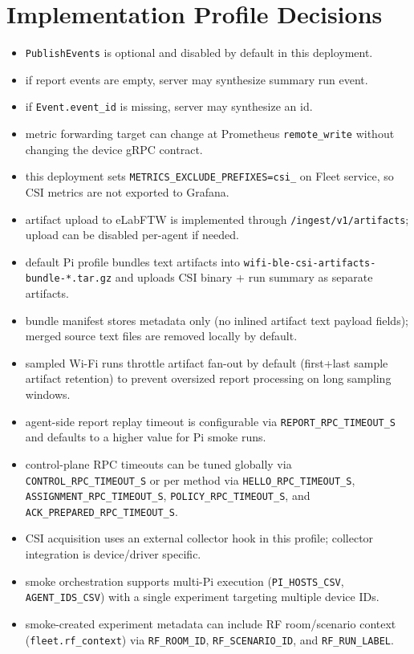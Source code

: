 \documentclass[11pt,a4paper]{article}
\begin{document}
\section{Implementation Profile Decisions}
\begin{itemize}
  \item \texttt{PublishEvents} is optional and disabled by default in this deployment.
  \item if report events are empty, server may synthesize summary run event.
  \item if \texttt{Event.event\_id} is missing, server may synthesize an id.
  \item metric forwarding target can change at Prometheus \texttt{remote\_write} without changing the device gRPC contract.
  \item this deployment sets \texttt{METRICS\_EXCLUDE\_PREFIXES=csi\_} on Fleet service, so CSI metrics are not exported to Grafana.
  \item artifact upload to eLabFTW is implemented through \texttt{/ingest/v1/artifacts}; upload can be disabled per-agent if needed.
  \item default Pi profile bundles text artifacts into \texttt{wifi-ble-csi-artifacts-bundle-*.tar.gz} and uploads CSI binary + run summary as separate artifacts.
  \item bundle manifest stores metadata only (no inlined artifact text payload fields); merged source text files are removed locally by default.
  \item sampled Wi-Fi runs throttle artifact fan-out by default (first+last sample artifact retention) to prevent oversized report processing on long sampling windows.
  \item agent-side report replay timeout is configurable via \texttt{REPORT\_RPC\_TIMEOUT\_S} and defaults to a higher value for Pi smoke runs.
  \item control-plane RPC timeouts can be tuned globally via \texttt{CONTROL\_RPC\_TIMEOUT\_S} or per method via \texttt{HELLO\_RPC\_TIMEOUT\_S}, \texttt{ASSIGNMENT\_RPC\_TIMEOUT\_S}, \texttt{POLICY\_RPC\_TIMEOUT\_S}, and \texttt{ACK\_PREPARED\_RPC\_TIMEOUT\_S}.
  \item CSI acquisition uses an external collector hook in this profile; collector integration is device/driver specific.
  \item smoke orchestration supports multi-Pi execution (\texttt{PI\_HOSTS\_CSV}, \texttt{AGENT\_IDS\_CSV}) with a single experiment targeting multiple device IDs.
  \item smoke-created experiment metadata can include RF room/scenario context (\texttt{fleet.rf\_context}) via \texttt{RF\_ROOM\_ID}, \texttt{RF\_SCENARIO\_ID}, and \texttt{RF\_RUN\_LABEL}.

\end{itemize}
\end{document}
